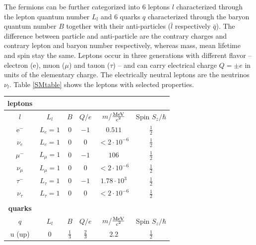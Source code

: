 The fermions can be further categorized into $6$ leptons $l$ characterized through the lepton quantum number $L_l$ and $6$ quarks $q$ characterized through the baryon quantum number $B$ together with their anti-particles ($\bar{l}$ respectively $\bar{q}$). The difference between particle and anti-particle are the contrary charges and contrary lepton and baryon number respectively, whereas mass, mean lifetime and spin stay the same. Leptons occur in three generations with different flavor -- electron (e), muon ($\mu$) and tauon ($\tau$) -- and can carry electrical charge $Q=\pm e$ in units of the elementary charge. The electrically neutral leptons are the neutrinos $\nu_l$. \cite{Griffiths}\newline
Table \ref{SMtable} shows the leptons with selected properties.\newline
\begin{table}[htbp]
		\centering
		\begin{tabular*}{\linewidth}{@{\extracolsep{\fill}}cccccc}
		\hline
		\hline
		\rule[-6pt]{0pt}{21pt}\textbf{leptons}  & & & &
		\\
		\hline
		\rule[-7pt]{0pt}{23pt} $l$ & $L_l$ & $B$ & $Q/e$ & $m$/$\frac{\SI{}{\mega\electronvolt}}{\SI{}{\text{\ensuremath{c}\squared}}}$ & Spin $S_z/\hbar$
		\\
		\hline
		\rule[-6pt]{0pt}{21pt} e$^-$ & \(L_e=1\) & $0$ & $-1$ & $0.511$ & $\frac{1}{2}$
		\\
		\rule[-6pt]{0pt}{21pt}$\nu_e$&  \(L_e=1\)	& $0$ & $0$ & $<2\cdot10^{-6}$ & $\frac{1}{2}$
		\\
		\rule[-6pt]{0pt}{21pt} $\mu^-$ & \(L_{\mu}=1\) & $0$ & $-1$ & $106$ & $\frac{1}{2}$
		\\
		\rule[-6pt]{0pt}{21pt}$\nu_{\mu}$ &  \(L_{\mu}=1\)	& $0$ & $0$ & $<2\cdot10^{-6}$ & $\frac{1}{2}$
		\\
		\rule[-6pt]{0pt}{21pt} $\tau^-$ & \(L_{\tau}=1\) & $0$ & $-1$ & $1.78\cdot10^3$ & $\frac{1}{2}$
		\\
		\rule[-6pt]{0pt}{21pt}$\nu_{\tau}$&  \(L_{\tau}=1\)	& $0$ & $0$ & $<2\cdot10^{-6}$ & $\frac{1}{2}$
		\\
		\rule[-6pt]{0pt}{21pt}  & & & &
		\\
		\rule[-6pt]{0pt}{21pt}\textbf{quarks}  & & & &
		\\
		\hline
		\rule[-7pt]{0pt}{23pt} $q$ & \(L_l\) & $B$ & $Q/e$ & $m$/$\frac{\SI{}{\mega\electronvolt}}{\SI{}{\text{\ensuremath{c}\squared}}}$ & Spin $S_z/\hbar$
		\\
		\hline
		\rule[-6pt]{0pt}{21pt} u (up) &  $0$	& $\frac{1}{3}$ & $\frac{2}{3}$ & $2.2$ & $\frac{1}{2}$

\end{tabular*}
\end{table}
